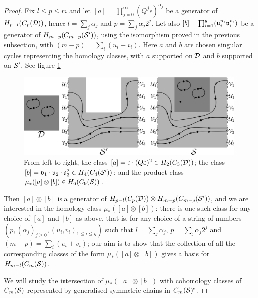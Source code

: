 \begin{proof}
Fix $l\leq p\leq m$ and let $[a]=\prod_{j=0}^{\infty}(Q^j\epsilon)^{\alpha_j}$ be a generator of
$H_{p-l}(C_p(\D))$, hence $l=\sum_j\alpha_j$ and $p=\sum_j\alpha_j2^j$. Let also
$[b]=\prod_{i=1}^g (\u_i^{u_i}\v_i^{v_i})$ be a generator of $H_{m-p}(C_{m-p}(\S'))$, using the
isomorphism proved in the previous subsection, with $(m-p)=\sum_i(u_i+v_i)$. Here $a$ and
$b$ are chosen singular cycles representing the homology classes, with $a$ supported on $\D$
and $b$ supported on $\S'$. See figure \ref{fig:axb}

\begin{figure}\centering
 \includegraphics[scale=0.65]{figures/axb.png}
 \caption{From left to right, the class $[a]=\epsilon\cdot(Q\epsilon)^2\in H_2(C_3(\D))$;
 the class $[b]=\v_1\cdot\u_2\cdot\v_3^2\in H_4(C_4(\S'))$; and the product class
 $\mu_*([a]\otimes[b])\in H_6(C_9(\S))$.}
\label{fig:axb}
\end{figure}

Then $[a]\otimes [b]$ is a generator of $H_{p-l}(C_p(\D))\otimes H_{m-p}(C_{m-p}(\S'))$,
and we are interested in the homology class $\mu_*([a]\otimes [b])$: there is one such
class for any choice of $[a]$ and $[b]$ as above, that is, for any choice of a string of numbers
$(p,(\alpha_j)_{j\geq 0},(u_i,v_i)_{1\leq i\leq g})$
such that $l=\sum_j\alpha_j$, $p=\sum_j\alpha_j2^j$ and $(m-p)=\sum_i(u_i+v_i)$; our aim
is to show that the collection of all the corresponding classes of the form $\mu_*([a]\otimes [b])$
gives a basis for $H_{m-l}(\cms)$.

We will study
the intersection of $\mu_*([a]\otimes [b])$ with cohomology classes of $\cms$ represented by
generalised symmetric chains in $\cms^c$.





\end{proof}
